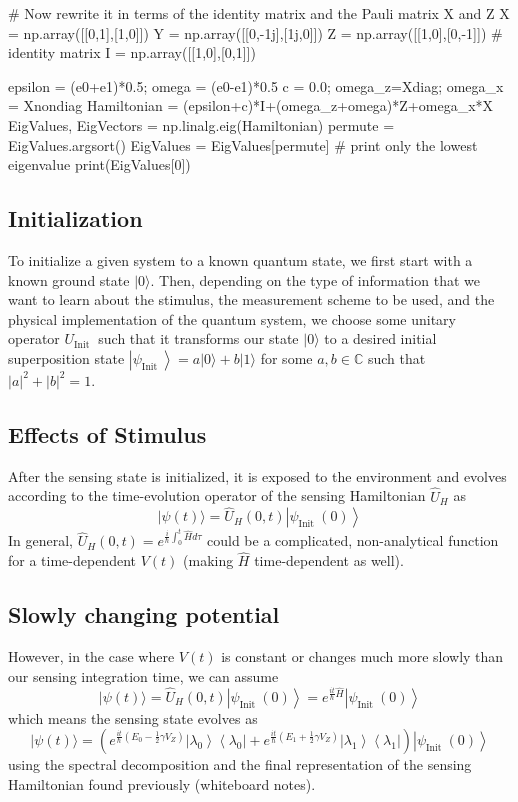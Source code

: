 \documentclass[%
oneside,                 %
final,                   %
10pt]{article}
\begin{document}
\bpycod
# Now rewrite it in terms of the identity matrix and the Pauli matrix X and Z
X = np.array([[0,1],[1,0]])
Y = np.array([[0,-1j],[1j,0]])
Z = np.array([[1,0],[0,-1]])
# identity matrix
I = np.array([[1,0],[0,1]])

epsilon = (e0+e1)*0.5; omega = (e0-e1)*0.5
c = 0.0; omega_z=Xdiag; omega_x = Xnondiag
Hamiltonian = (epsilon+c)*I+(omega_z+omega)*Z+omega_x*X
EigValues, EigVectors = np.linalg.eig(Hamiltonian)
permute = EigValues.argsort()
EigValues = EigValues[permute]
# print only the lowest eigenvalue
print(EigValues[0])

\epycod


\subsection{Initialization}

To initialize a given system to a known quantum state, we first start
with a known ground state $|0\rangle$. Then, depending on the type of
information that we want to learn about the stimulus, the measurement
scheme to be used, and the physical implementation of the quantum
system, we choose some unitary operator $U_{\text {Init }}$ such that
it transforms our state $|0\rangle$ to a desired initial superposition
state $\left|\psi_{\text {Init }}\right\rangle=a|0\rangle+b|1\rangle$
for some $a, b \in \mathbb{C}$ such that $|a|^{2}+|b|^{2}=1$.

\subsection{Effects of Stimulus}

After the sensing state is initialized, it is exposed to the environment and evolves according to the time-evolution operator of the sensing Hamiltonian $\hat{U}_{H}$ as
\[
|\psi(t)\rangle=\hat{U}_{H}(0, t)\left|\psi_{\text {Init }}(0)\right\rangle
\]
In general, $\hat{U}_{H}(0, t)=e^{\frac{i}{\hbar} \int_{0}^{t} \hat{H} d \tau}$ could be a complicated, non-analytical function for a time-dependent $V(t)$ (making $\hat{H}$ time-dependent as well).

\subsection{Slowly changing potential}

However, in the case where $V(t)$ is constant or changes much more slowly than our sensing integration time, we can assume
\[
|\psi(t)\rangle=\hat{U}_{H}(0, t)\left|\psi_{\text {Init }}(0)\right\rangle=e^{\frac{i t}{\hbar} \hat{H}}\left|\psi_{\text {Init }}(0)\right\rangle
\]
which means the sensing state evolves as
\[
|\psi(t)\rangle=\left(e^{\frac{i t}{\hbar}\left(E_{0}-\frac{1}{2} \gamma V_Z\right)}\left|\lambda_{0}\right\rangle\left\langle\lambda_{0}\right|+e^{\frac{i t}{\hbar}\left(E_{1}+\frac{1}{2} \gamma V_Z\right)}\left|\lambda_{1}\right\rangle\left\langle\lambda_{1}\right|\right)\left|\psi_{\text {Init }}(0)\right\rangle
\]
using the spectral decomposition and the final representation of the
sensing Hamiltonian found previously (whiteboard notes).
\end{document}
